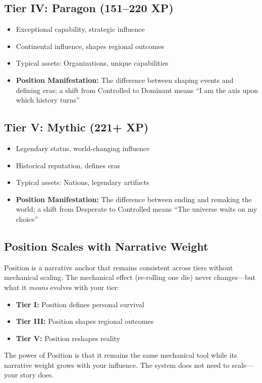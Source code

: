 \documentclass[11pt,twoside,openany]{book}
\begin{document}
\subsection{Tier IV: Paragon (151--220 XP)}
\begin{itemize}
\item Exceptional capability, strategic influence
\item Continental influence, shapes regional outcomes
\item Typical assets: Organizations, unique capabilities
\item \textbf{Position Manifestation:} The difference between shaping events and defining eras; a shift from Controlled to Dominant means ``I am the axis upon which history turns''
\end{itemize}

\subsection{Tier V: Mythic (221+ XP)}
\begin{itemize}
\item Legendary status, world-changing influence
\item Historical reputation, defines eras
\item Typical assets: Nations, legendary artifacts
\item \textbf{Position Manifestation:} The difference between ending and remaking the world; a shift from Desperate to Controlled means ``The universe waits on my choice''
\end{itemize}

\subsection{Position Scales with Narrative Weight}
Position is a narrative anchor that remains consistent across tiers without mechanical scaling. The mechanical effect (re-rolling one die) never changes---but what it \textit{means} evolves with your tier:

\begin{itemize}
\item \textbf{Tier I:} Position defines personal survival
\item \textbf{Tier III:} Position shapes regional outcomes
\item \textbf{Tier V:} Position reshapes reality
\end{itemize}

The power of Position is that it remains the same mechanical tool while its narrative weight grows with your influence. The system does not need to scale---your story does.
\end{document}
